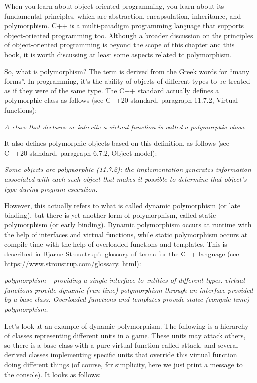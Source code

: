 When you learn about object-oriented programming, you learn about its fundamental principles, which are abstraction, encapsulation, inheritance, and polymorphism. C++ is a multi-paradigm programming language that supports object-oriented programming too. Although a broader discussion on the principles of object-oriented programming is beyond the scope of this chapter and this book, it is worth discussing at least some aspects related to polymorphism.

So, what is polymorphism? The term is derived from the Greek words for “many forms”. In programming, it’s the ability of objects of different types to be treated as if they were of the same type. The C++ standard actually defines a polymorphic class as follows (see C++20 standard, paragraph 11.7.2, Virtual functions):

\begin{center}
\textit{
A class that declares or inherits a virtual function is called a polymorphic class.
}
\end{center}

It also defines polymorphic objects based on this definition, as follows (see C++20 standard, paragraph 6.7.2, Object model):

\begin{center}
\textit{
Some objects are polymorphic (11.7.2); the implementation generates information associated with each such object that makes it possible to determine that object’s type during program execution.
}
\end{center}

However, this actually refers to what is called dynamic polymorphism (or late binding), but there is yet another form of polymorphism, called static polymorphism (or early binding). Dynamic polymorphism occurs at runtime with the help of interfaces and virtual functions, while static polymorphism occurs at compile-time with the help of overloaded functions and templates. This is described in Bjarne Stroustrup’s glossary of terms for the C++ language (see \url{https://www.stroustrup.com/glossary.
html}):

\begin{center}
\textit{
polymorphism - providing a single interface to entities of different types. virtual functions provide dynamic (run-time) polymorphism through an interface provided by a base class. Overloaded functions and templates provide static (compile-time) polymorphism.
}
\end{center}

Let’s look at an example of dynamic polymorphism. The following is a hierarchy of classes representing different units in a game. These units may attack others, so there is a base class with a pure virtual function called attack, and several derived classes implementing specific units that override this virtual function doing different things (of course, for simplicity, here we just print a message to the console). It looks as follows:

